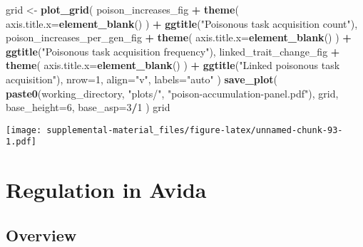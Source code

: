 \documentclass[]{book}
\newenvironment{Shaded}{\begin{snugshade}}{\end{snugshade}}
\newcommand{\DataTypeTok}[1]{\textcolor[rgb]{0.13,0.29,0.53}{#1}}
\newcommand{\DecValTok}[1]{\textcolor[rgb]{0.00,0.00,0.81}{#1}}
\newcommand{\KeywordTok}[1]{\textcolor[rgb]{0.13,0.29,0.53}{\textbf{#1}}}
\newcommand{\NormalTok}[1]{#1}
\newcommand{\OperatorTok}[1]{\textcolor[rgb]{0.81,0.36,0.00}{\textbf{#1}}}
\newcommand{\StringTok}[1]{\textcolor[rgb]{0.31,0.60,0.02}{#1}}
\begin{document}
\begin{Shaded}
\begin{Highlighting}[]
\NormalTok{grid <-}\StringTok{ }\KeywordTok{plot_grid}\NormalTok{(}
\NormalTok{  poison_increases_fig }\OperatorTok{+}
\StringTok{    }\KeywordTok{theme}\NormalTok{(}
      \DataTypeTok{axis.title.x=}\KeywordTok{element_blank}\NormalTok{()}
\NormalTok{    ) }\OperatorTok{+}
\StringTok{    }\KeywordTok{ggtitle}\NormalTok{(}\StringTok{"Poisonous task acquisition count"}\NormalTok{),}
\NormalTok{  poison_increases_per_gen_fig }\OperatorTok{+}
\StringTok{    }\KeywordTok{theme}\NormalTok{(}
      \DataTypeTok{axis.title.x=}\KeywordTok{element_blank}\NormalTok{()}
\NormalTok{    ) }\OperatorTok{+}
\StringTok{    }\KeywordTok{ggtitle}\NormalTok{(}\StringTok{"Poisonous task acquisition frequency"}\NormalTok{),}
\NormalTok{  linked_trait_change_fig }\OperatorTok{+}
\StringTok{    }\KeywordTok{theme}\NormalTok{(}
      \DataTypeTok{axis.title.x=}\KeywordTok{element_blank}\NormalTok{()}
\NormalTok{    ) }\OperatorTok{+}
\StringTok{    }\KeywordTok{ggtitle}\NormalTok{(}\StringTok{"Linked poisonous task acquisition"}\NormalTok{),}
  \DataTypeTok{nrow=}\DecValTok{1}\NormalTok{,}
  \DataTypeTok{align=}\StringTok{"v"}\NormalTok{,}
  \DataTypeTok{labels=}\StringTok{"auto"}
\NormalTok{)}
\KeywordTok{save_plot}\NormalTok{(}
   \KeywordTok{paste0}\NormalTok{(working_directory, }\StringTok{"plots/"}\NormalTok{, }\StringTok{"poison-accumulation-panel.pdf"}\NormalTok{),}
\NormalTok{   grid,}
   \DataTypeTok{base_height=}\DecValTok{6}\NormalTok{,}
   \DataTypeTok{base_asp=}\DecValTok{3}\OperatorTok{/}\DecValTok{1}
\NormalTok{)}
\NormalTok{grid}
\end{Highlighting}
\end{Shaded}

\texttt{[image: supplemental-material\_files/figure-latex/unnamed-chunk-93-1.pdf]}

\hypertarget{regulation-in-avida}{%
\chapter{Regulation in Avida}\label{regulation-in-avida}}

\hypertarget{overview-4}{%
\section{Overview}\label{overview-4}}
\end{document}
